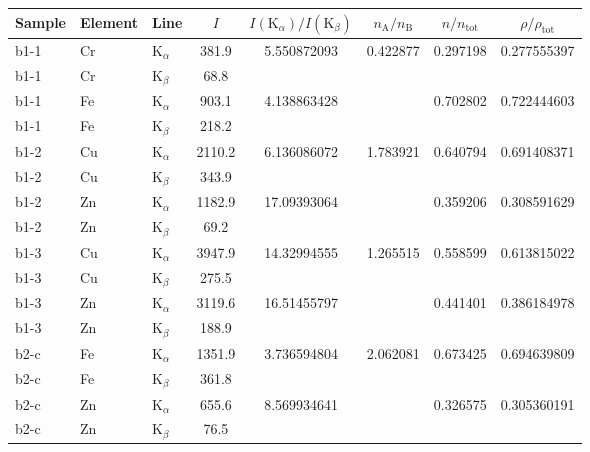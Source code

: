 \documentclass[11pt,a4paper,twoside,onecolumn]{article}
\newcommand{\Kalpha}{$\mathrm{K}_\alpha$~}
\newcommand{\Kbeta}{$\mathrm{K}_\beta$~}
\begin{document}
\begin{table}[htbp]
\centering
{}
\begin{tabular}{@{}
    lll
    S[table-figures-decimal = 2, round-precision=1]
    S[table-figures-decimal = 2, round-precision=2]
    S[table-figures-decimal = 2, round-precision=2]
    S[table-figures-decimal = 2, round-precision=2]
    S[table-figures-decimal = 2, round-precision=2]
    @{}
    }
\toprule
Sample & Element & Line & {$I$} & {$I(\mathrm{K}_\alpha) / I(\mathrm{K}_\beta)$} & {$n_\mathrm{A} / n_\mathrm{B}$} & {$n / n_\mathrm{tot}$} & {$\rho / \rho_\mathrm{tot}$} \\ \midrule
b1-1 & Cr & \Kalpha & 381.9  & 5.550872093 & 0.422877 & 0.297198 & 0.277555397 \\
b1-1 & Cr & \Kbeta  & 68.8   &             &          &          &             \\
b1-1 & Fe & \Kalpha & 903.1  & 4.138863428 &          & 0.702802 & 0.722444603 \\
b1-1 & Fe & \Kbeta  & 218.2  &             &          &          &             \\ \midrule
b1-2 & Cu & \Kalpha & 2110.2 & 6.136086072 & 1.783921 & 0.640794 & 0.691408371 \\
b1-2 & Cu & \Kbeta  & 343.9  &             &          &          &             \\
b1-2 & Zn & \Kalpha & 1182.9 & 17.09393064 &          & 0.359206 & 0.308591629 \\
b1-2 & Zn & \Kbeta  & 69.2   &             &          &          &             \\ \midrule
b1-3 & Cu & \Kalpha & 3947.9 & 14.32994555 & 1.265515 & 0.558599 & 0.613815022 \\
b1-3 & Cu & \Kbeta  & 275.5  &             &          &          &             \\
b1-3 & Zn & \Kalpha & 3119.6 & 16.51455797 &          & 0.441401 & 0.386184978 \\
b1-3 & Zn & \Kbeta  & 188.9  &             &          &          &             \\ \midrule
b2-c & Fe & \Kalpha & 1351.9 & 3.736594804 & 2.062081 & 0.673425 & 0.694639809 \\
b2-c & Fe & \Kbeta  & 361.8  &             &          &          &             \\
b2-c & Zn & \Kalpha & 655.6  & 8.569934641 &          & 0.326575 & 0.305360191 \\
b2-c & Zn & \Kbeta  & 76.5   &             &          &          &             \\ \midrule

\end{tabular}
\end{table}
\end{document}
